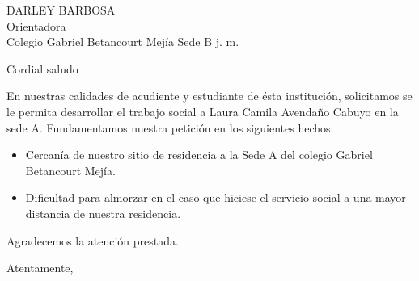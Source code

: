 \documentclass[letterpaper,spanish,11pt]{letter}
\begin{document}
\begin{letter}{DARLEY BARBOSA\\Orientadora\\Colegio Gabriel Betancourt Mejía Sede B j. m.}
	
\opening{Cordial saludo}
En nuestras calidades de acudiente y estudiante de ésta institución, solicitamos se le permita desarrollar el trabajo social a Laura Camila Avendaño Cabuyo en la sede A. Fundamentamos nuestra petición en los siguientes hechos:
\begin{itemize}
\item Cercan\'{i}a de nuestro sitio de residencia a la Sede A del colegio Gabriel Betancourt Mej\'{i}a.
\item Dificultad para almorzar en el caso que hiciese el servicio social a una mayor distancia de nuestra residencia.
\end{itemize}
Agradecemos la atenci\'{o}n prestada.
\closing{Atentamente,}


\end{letter}
\end{document}
